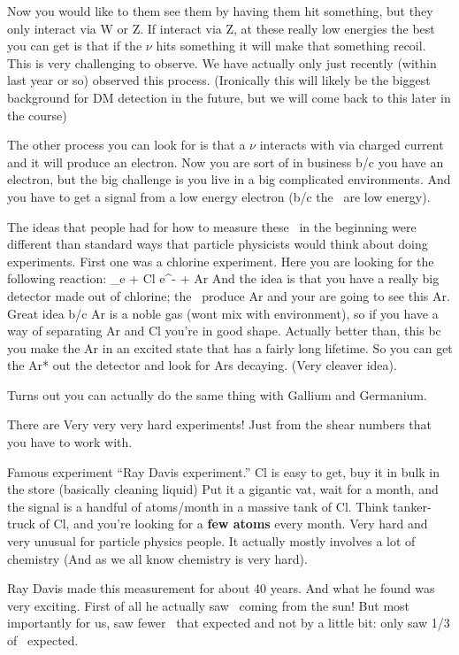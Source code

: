 {Now you would like to them see them by having them hit something, but they only interact via W or Z. 
If interact via Z, at these really low energies the best you can get is that if the $\nu$ hits something it will make that something recoil. 
This is very challenging to observe.  
We have actually only just recently (within last year or so) observed this process. 
(Ironically this will likely be the biggest background for DM detection in the future, but we will come back to this later in the course) 

The other process you can look for is that a $\nu$ interacts with via charged current and it will produce an electron. 
Now you are sort of in business b/c you have an electron, but the big challenge is you live in a big complicated environments.
And you have to get a signal from a low energy electron (b/c the \nus\ are low energy).

The ideas that people had for how to measure these \nus\ in the beginning were different than standard ways that particle physicists would think about doing experiments. 
First one was a chlorine experiment.  
Here you are looking for the following reaction:
\be
\nu_e + Cl \rightarrow e^- + Ar
\ee
And the idea is that you have a really big detector made out of chlorine; the \nus\ produce Ar and your are going to see this Ar. 
Great idea b/c Ar is a noble gas (wont mix with environment), so if you have a way of separating Ar and Cl you're in good shape. 
Actually better than, this bc you make the Ar in an excited state that has a fairly long lifetime. 
So you can get the Ar* out the detector and look for Ars decaying. (Very cleaver idea). 

Turns out you can actually do the same thing with Gallium and Germanium. 

There are Very very very hard experiments!
Just from the shear numbers that you have to work with. 

Famous experiment ``Ray Davis experiment.''
Cl is easy to get, buy it in bulk in the store (basically cleaning liquid)
Put it a gigantic vat, wait for a month, and the signal is a handful of atoms/month in a massive tank of Cl. 
Think tanker-truck of Cl, and you're looking for a \textbf{few atoms} every month.
Very hard and very unusual for particle physics people.
It actually mostly involves a lot of chemistry (And as we all know chemistry is very hard).

Ray Davis made this measurement for about 40 years. 
And what he found was very exciting. 
First of all he actually saw \nus\ coming from the sun!
But most importantly for us, saw fewer \nus\ that expected and not by a little bit: only saw 1/3 of \nus\ expected. 

}
